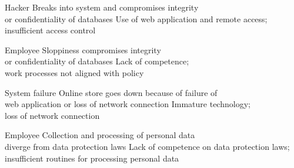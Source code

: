 \begin{corashighlevelanalysistable}[
  caption={Documenting the high-level analysis},
  label={tab:high-level-analysis}
]
  \corashighlevelanalysisrow
    {Hacker}
    {Breaks into system and compromises integrity\\or confidentiality of databases}
    {Use of web application and remote access;\\insufficient access control}

  \corashighlevelanalysisrow
    {Employee}
    {Sloppiness compromises integrity\\or confidentiality of databases}
    {Lack of competence;\\work processes not aligned with policy}

  \corashighlevelanalysisrow
    {System failure}
    {Online store goes down because of failure of\\web application or loss of network connection}
    {Immature technology;\\loss of network connection}

  \corashighlevelanalysisrow
    {Employee}
    {Collection and processing of personal data\\diverge from data protection laws}
    {Lack of competence on data protection laws;\\insufficient routines for processing personal data}
\end{corashighlevelanalysistable}
